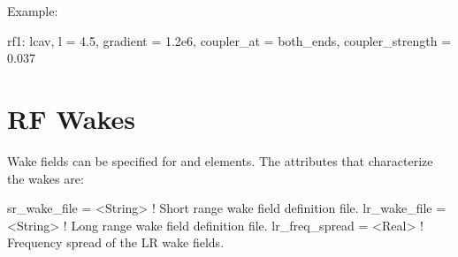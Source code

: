 Example:
\begin{example}
  rf1: lcav, l = 4.5, gradient = 1.2e6, coupler_at = both_ends, coupler_strength = 0.037
\end{example}

\section{RF Wakes}
\label{s:rf.wakes}

Wake fields can be specified for  and  elements.
The attributes that characterize the wakes are:
\begin{example}
  sr_wake_file     = <String> ! Short range wake field definition file.
  lr_wake_file     = <String> ! Long range wake field definition file.
  lr_freq_spread   = <Real>   ! Frequency spread of the LR wake fields.
\end{example}

